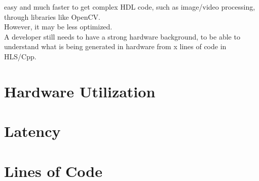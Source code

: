 easy and much faster to get complex HDL code, such as image/video processing, through libraries like OpenCV.\\
However, it may be less optimized.\\
A developer still needs to have a strong hardware background, to be able to understand what is being generated in hardware from x lines of code in HLS/Cpp.

\section{Hardware Utilization}

\section{Latency}

  \section{Lines of Code}

